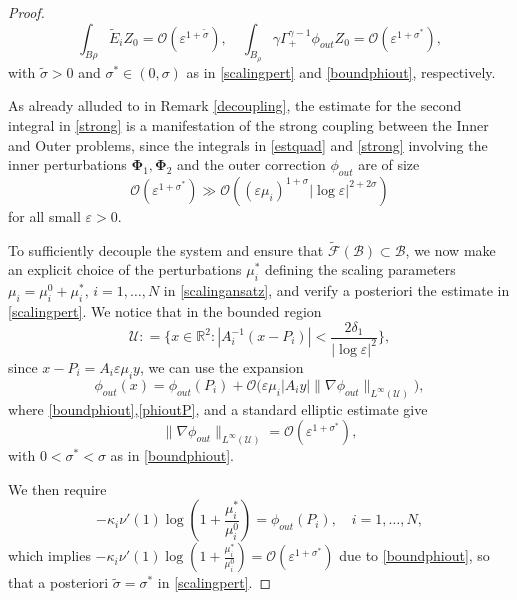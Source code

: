\documentclass[11pt,reqno,a4paper]{amsart}
\numberwithin{equation}{section}
\newcommand{\R}{\mathbb{R}}
\newcommand{\defeq}{\mathrel{\mathop:}=}
\newcommand{\ve}{\varepsilon}
\begin{document}
\begin{proof}
\begin{equation}\label{strong}
\int_{B{\rho}}\widetilde{E}_iZ_0 =\mathcal{O}\left(\ve^{1+\tilde{\sigma}}\right), \quad \int_{B_{\rho}}\gamma\Gamma^{\gamma-1}_{+}\phi_{out}Z_0=\mathcal{O}\left(\ve^{1+\sigma^{*}}\right),
\end{equation}
with $\tilde\sigma>0$ and $\sigma^{*}\in(0,\sigma)$ as in \eqref{scalingpert} and \eqref{boundphiout}, respectively.

As already alluded to in Remark \ref{decoupling}, the estimate for the second integral in \eqref{strong} is a manifestation of the strong coupling between the Inner and Outer problems, since the integrals in \eqref{estquad} and \eqref{strong} involving the inner perturbations $\mathbf{\Phi}_{1},\mathbf{\Phi}_2$ and the outer correction $\phi_{out}$ are of size \[\mathcal{O}\left(\ve^{1+\sigma^{*}}\right) \gg \mathcal{O}\left(\left(\ve\mu_i\right)^{1+\sigma}|\log\ve|^{2+2\sigma}\right)\]
for all small $\ve>0.$

To sufficiently decouple the system and ensure that $\widetilde{\mathcal{F}}(\mathcal{B})\subset\mathcal{B}$, we now make an explicit choice of the perturbations $\mu^{*}_i$ defining the scaling parameters $\mu_i=\mu_i^{0}+\mu_i^{*},\,i=1,\dots,N$ in \eqref{scalingansatz},  and verify a posteriori the estimate in \eqref{scalingpert}. We notice that in the bounded region
\[\mathcal{U}\defeq\Big\{x\in\R^2: |A_i^{-1}(x-P_i)|<\frac{2\delta_1}{|\log\ve|^2}\Big\},\] since $x-P_i=A_i\ve\mu_i y$, we can use the expansion
\begin{equation}\label{expphiout}
\phi_{out}(x)=\phi_{out}(P_i)+ \mathcal{O}\big(\ve\mu_i|A_iy|\|\nabla\phi_{out}\|_{L^{\infty}(\mathcal{U})}\big),
\end{equation}
where \eqref{boundphiout},\eqref{phioutP}, and a standard elliptic estimate give \[\|\nabla\phi_{out}\|_{L^{\infty}(\mathcal{U})}=\mathcal{O}(\ve^{1+\sigma^{*}}
),\] with $0<\sigma^{*}<\sigma$ as in \eqref{boundphiout}.

We then require
\begin{equation}\label{scalingpertexplicit}
-\kappa_i\nu'(1)\log\left(1+\frac{\mu_i^{*}}{\mu_i^{0}}\right)=\phi_{out}(P_i), \quad i=1,\dots,N,
\end{equation}
which implies $-\kappa_i\nu'(1)\log\left(1+\frac{\mu_i^{*}}{\mu_i^{0}}\right)=\mathcal{O}\left(\ve^{1+\sigma^{*}}\right)$ due to \eqref{boundphiout}, so that a posteriori $\tilde{\sigma}=\sigma^{*}$ in \eqref{scalingpert}. 


\end{proof}
\end{document}
